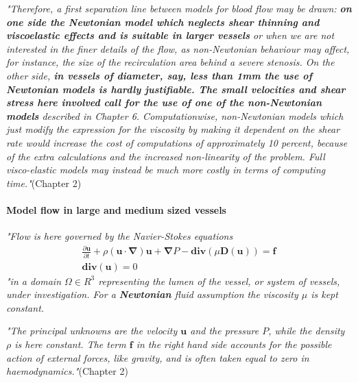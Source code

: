 \documentclass[11pt,letterpaper]{article}
\begin{document}
\textit{"Therefore, a first separation line between models for blood flow may be drawn: \textbf{on one side the Newtonian model which neglects shear thinning and viscoelastic effects and is suitable in larger vessels} or when we are not interested in the finer details of the flow, as non-Newtonian behaviour may affect, for instance, the size of the recirculation area behind a severe stenosis. On the other side, \textbf{in vessels of diameter, say, less than 1mm the use of Newtonian models is hardly justifiable. The small velocities and shear stress here involved call for the use of one of the non-Newtonian models} described in Chapter 6. Computationwise, non-Newtonian models which just modify the expression for the viscosity by making it dependent on the shear rate would increase the cost of computations of approximately 10 percent, because of the extra calculations and the increased non-linearity of the problem. Full visco-elastic models may instead be much more costly in terms of computing time."}(Chapter 2)

\paragraph*{Model flow in large
and medium sized vessels}
\textit{"Flow is here governed by the Navier-Stokes equations}
\begin{align}
    \frac{\partial \bm{u}}{\partial t} + \rho (\bm{u} \cdot \bm{\nabla})\bm{u} + \bm{\nabla}P - \bm{div}(\mu \bm{D}(\bm{u})) = \bm{f} \\
    \bm{div}(\bm{u}) = 0
\end{align}
\textit{"in a domain $\Omega \in \mathrm{}{R}^3$ representing the lumen of the vessel, or system of vessels, under investigation.
For a \textbf{Newtonian} fluid assumption the viscosity $\mu$ is kept constant.} 

\textit{"The principal unknowns are the velocity $\bm{u}$ and the pressure $P$, while the density $\rho$ is here constant. The term $\bm{f}$ in the right hand side accounts for the possible action of external forces, like gravity, and is often taken equal to zero in haemodynamics."}(Chapter 2)
\end{document}
